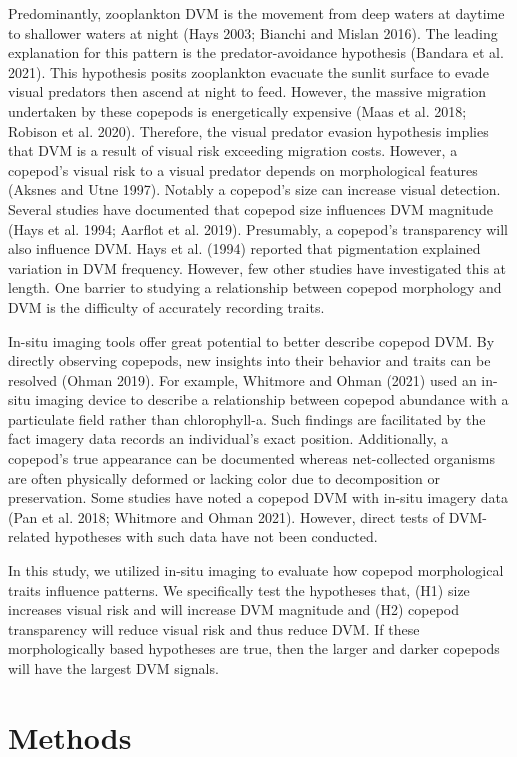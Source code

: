 \documentclass[
]{article}
\begin{document}
Predominantly, zooplankton DVM is the movement from deep waters at
daytime to shallower waters at night (Hays 2003; Bianchi and Mislan
2016). The leading explanation for this pattern is the
predator-avoidance hypothesis (Bandara et al. 2021). This hypothesis
posits zooplankton evacuate the sunlit surface to evade visual predators
then ascend at night to feed. However, the massive migration undertaken
by these copepods is energetically expensive (Maas et al. 2018; Robison
et al. 2020). Therefore, the visual predator evasion hypothesis implies
that DVM is a result of visual risk exceeding migration costs. However,
a copepod's visual risk to a visual predator depends on morphological
features (Aksnes and Utne 1997). Notably a copepod's size can increase
visual detection. Several studies have documented that copepod size
influences DVM magnitude (Hays et al. 1994; Aarflot et al. 2019).
Presumably, a copepod's transparency will also influence DVM. Hays et
al. (1994) reported that pigmentation explained variation in DVM
frequency. However, few other studies have investigated this at length.
One barrier to studying a relationship between copepod morphology and
DVM is the difficulty of accurately recording traits.

In-situ imaging tools offer great potential to better describe copepod
DVM. By directly observing copepods, new insights into their behavior
and traits can be resolved (Ohman 2019). For example, Whitmore and Ohman
(2021) used an in-situ imaging device to describe a relationship between
copepod abundance with a particulate field rather than chlorophyll-a.
Such findings are facilitated by the fact imagery data records an
individual's exact position. Additionally, a copepod's true appearance
can be documented whereas net-collected organisms are often physically
deformed or lacking color due to decomposition or preservation. Some
studies have noted a copepod DVM with in-situ imagery data (Pan et al.
2018; Whitmore and Ohman 2021). However, direct tests of DVM-related
hypotheses with such data have not been conducted.

In this study, we utilized in-situ imaging to evaluate how copepod
morphological traits influence patterns. We specifically test the
hypotheses that, (H1) size increases visual risk and will increase DVM
magnitude and (H2) copepod transparency will reduce visual risk and thus
reduce DVM. If these morphologically based hypotheses are true, then the
larger and darker copepods will have the largest DVM signals.

\hypertarget{methods}{%
\section{Methods}\label{methods}}
\end{document}
